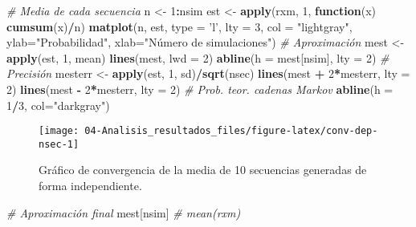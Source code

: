 \documentclass[
]{book}
\newenvironment{Shaded}{\begin{snugshade}}{\end{snugshade}}
\newcommand{\CommentTok}[1]{\textcolor[rgb]{0.56,0.35,0.01}{\textit{#1}}}
\newcommand{\ControlFlowTok}[1]{\textcolor[rgb]{0.13,0.29,0.53}{\textbf{#1}}}
\newcommand{\DataTypeTok}[1]{\textcolor[rgb]{0.13,0.29,0.53}{#1}}
\newcommand{\DecValTok}[1]{\textcolor[rgb]{0.00,0.00,0.81}{#1}}
\newcommand{\KeywordTok}[1]{\textcolor[rgb]{0.13,0.29,0.53}{\textbf{#1}}}
\newcommand{\NormalTok}[1]{#1}
\newcommand{\OperatorTok}[1]{\textcolor[rgb]{0.81,0.36,0.00}{\textbf{#1}}}
\newcommand{\StringTok}[1]{\textcolor[rgb]{0.31,0.60,0.02}{#1}}
\theoremstyle{break}
\theoremstyle{definition}
\theoremstyle{definition}
\theoremstyle{definition}
\theoremstyle{remark}
\begin{document}
\begin{Shaded}
\begin{Highlighting}[]
\CommentTok{# Media de cada secuencia}
\NormalTok{n <-}\StringTok{ }\DecValTok{1}\OperatorTok{:}\NormalTok{nsim}
\NormalTok{est <-}\StringTok{ }\KeywordTok{apply}\NormalTok{(rxm, }\DecValTok{1}\NormalTok{, }\ControlFlowTok{function}\NormalTok{(x) }\KeywordTok{cumsum}\NormalTok{(x)}\OperatorTok{/}\NormalTok{n)}
\KeywordTok{matplot}\NormalTok{(n, est, }\DataTypeTok{type =} \StringTok{'l'}\NormalTok{, }\DataTypeTok{lty =} \DecValTok{3}\NormalTok{, }\DataTypeTok{col =} \StringTok{"lightgray"}\NormalTok{,}
     \DataTypeTok{ylab=}\StringTok{"Probabilidad"}\NormalTok{, }\DataTypeTok{xlab=}\StringTok{"Número de simulaciones"}\NormalTok{)}
\CommentTok{# Aproximación}
\NormalTok{mest <-}\StringTok{ }\KeywordTok{apply}\NormalTok{(est, }\DecValTok{1}\NormalTok{, mean)}
\KeywordTok{lines}\NormalTok{(mest, }\DataTypeTok{lwd =} \DecValTok{2}\NormalTok{)}
\KeywordTok{abline}\NormalTok{(}\DataTypeTok{h =}\NormalTok{ mest[nsim], }\DataTypeTok{lty =} \DecValTok{2}\NormalTok{)}
\CommentTok{# Precisión}
\NormalTok{mesterr <-}\StringTok{ }\KeywordTok{apply}\NormalTok{(est, }\DecValTok{1}\NormalTok{, sd)}\OperatorTok{/}\KeywordTok{sqrt}\NormalTok{(nsec)}
\KeywordTok{lines}\NormalTok{(mest }\OperatorTok{+}\StringTok{ }\DecValTok{2}\OperatorTok{*}\NormalTok{mesterr, }\DataTypeTok{lty =} \DecValTok{2}\NormalTok{)}
\KeywordTok{lines}\NormalTok{(mest }\OperatorTok{-}\StringTok{ }\DecValTok{2}\OperatorTok{*}\NormalTok{mesterr, }\DataTypeTok{lty =} \DecValTok{2}\NormalTok{)}
\CommentTok{# Prob. teor. cadenas Markov}
\KeywordTok{abline}\NormalTok{(}\DataTypeTok{h =} \DecValTok{1}\OperatorTok{/}\DecValTok{3}\NormalTok{, }\DataTypeTok{col=}\StringTok{"darkgray"}\NormalTok{)     }
\end{Highlighting}
\end{Shaded}

\begin{figure}[!htb]

{\centering \texttt{[image: 04-Analisis\_resultados\_files/figure-latex/conv-dep-nsec-1]} 

}

\caption{Gráfico de convergencia de la media de 10 secuencias generadas de forma independiente.}\label{fig:conv-dep-nsec}
\end{figure}

\begin{Shaded}
\begin{Highlighting}[]
\CommentTok{# Aproximación final}
\NormalTok{mest[nsim] }\CommentTok{# mean(rxm)}
\end{Highlighting}
\end{Shaded}
\end{document}
